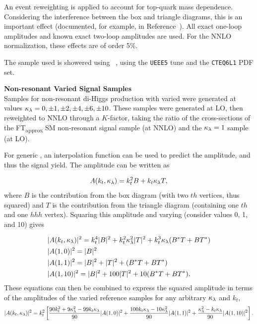 An event reweighting is applied to account for top-quark mass dependence. Considering the interference between the box and triangle diagrams, this is an important effect (documented, for example, in Reference~\cite{top-quark-mass-example}). All exact one-loop amplitudes and known exact two-loop amplitudes are used. For the \gls{NNLO} normalization, these effects are of order 5\%.

The sample used is showered using \HERWIGpp~\cite{herwigpp}, using the \texttt{UEEE5} tune and the \texttt{CTEQ6L1} PDF set.


\noindent\textbf{Non-resonant Varied \klambda Signal Samples}\\
\indent Samples for non-resonant di-Higgs production with varied \klambda were generated at values $\kappa_{\lambda} = 0, \pm 1, \pm 2, \pm 4, \pm 6, \pm 10$. These samples were generated at \gls{LO}, then reweighted to \gls{NNLO} through a $K$-factor, taking the ratio of the cross-sections of the FT\textsubscript{approx} \gls{SM} non-resonant signal sample (at \gls{NNLO}) and the $\kappa_{\lambda} =1$ sample (at \gls{LO}).

For generic \klambda, an interpolation function can be used to predict the amplitude, and thus the signal yield. The amplitude can be written as

\begin{equation}
  A(k_t,\kappa_{\lambda}) = k_t^2 B + k_t \kappa_{\lambda} T,
\end{equation}
%
where $B$ is the contribution from the box diagram (with two $th$ vertices, thus squared) and $T$ is the contribution from the triangle diagram (containing one $th$ and one $hhh$ vertex). Squaring this amplitude and varying \klambda (consider values 0, 1, and 10) gives

\begin{align}
  &|A(k_t,\kappa_{\lambda})|^2 = k_t^4 |B|^2 + k_t^2\kappa_{\lambda}^2 |T|^2 + k_t^3\kappa_{\lambda}(B^*T + BT^*)\\
  &|A(1,0)|^2 = |B|^2\\
  &|A(1,1)|^2 = |B|^2 + |T|^2 + (B^*T + BT^*)\\
  &|A(1,10)|^2 = |B|^2 + 100|T|^2 + 10(B^*T + BT^*).
\end{align}
%
These equations can then be combined to express the squared amplitude in terms of the amplitudes of the varied reference samples for any arbitrary $\kappa_{\lambda}$ and $k_t$,
\begin{equation}
  |A(k_t,\kappa_{\lambda})|^2 = k_t^2 \left[ 
    \frac{90 k_t^2 + 9\kappa_{\lambda}^2 - 99k_t\kappa_{\lambda}}{90}|A(1,0)|^2 +
    \frac{100 k_t\kappa_{\lambda} - 10\kappa_{\lambda}^2}{90}|A(1,1)|^2 +
    \frac{\kappa_{\lambda}^2 - k_t\kappa_{\lambda}}{90}|A(1,10)|^2 \right].
\end{equation}

